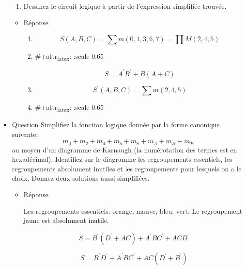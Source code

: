 \documentclass[letter, oneside]{book}
\begin{document}
\begin{itemize}
\begin{enumerate}
\item Dessinez le circuit logique à partir de l'expression simplifiée
trouvée.
\end{enumerate}

\begin{itemize}
\item Réponse
\label{sec:org109291d}
\begin{enumerate}
\item $$
      S (A, B, C) = \sum m(0, 1 , 3, 6, 7) = \prod M(2, 4, 5)
    $$

\item \#+attr\textsubscript{latex}: :scale 0.65
\begin{center}

\end{center}
$$
      S = A^{\prime} B^{\prime} + B(A + C)
    $$

\item $$
      S^{\prime}(A,B,C) = \sum m(2,4,5)
    $$

\item \#+attr\textsubscript{latex}: :scale 0.65
\begin{center}

\end{center}
\end{enumerate}
\end{itemize}

\item Question
\label{sec:org0b995a6}
Simplifiez la fonction logique donnée par la forme canonique
suivante:
$$
m_0 + m_2 + m_4 + m_5 + m_8 + m_A + m_B + m_E
$$
au
moyen d'un diagramme de Karnaugh (la numérotation des termes est en
hexadécimal). Identifiez sur le diagramme les regroupements
essentiels, les regroupements absolument inutiles et les
regroupements pour lesquels on a le choix. Donnez deux solutions
aussi simplifiées.

\begin{itemize}
\item Réponse
\label{sec:org78c56ce}
\begin{center}

\end{center}

Les regroupements essentiels: orange, mauve, bleu, vert.
Le regroupement jaune est absolument inutile.

$$
  S = B^{\prime} (D^{\prime}+ AC) + A^{\prime}BC^{\prime}  + ACD^{\prime} 
$$

$$
  S = B^{\prime}D^{\prime} + A^{\prime}BC^{\prime} + AC(D^{\prime} + B^{\prime})
$$
\end{itemize}


\end{itemize}
\end{document}
